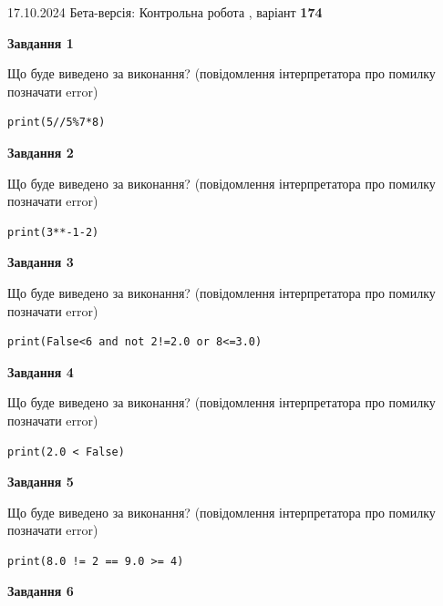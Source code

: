 \documentclass[12pt, ukrainian]{article}
\begin{document}
{\Large{17.10.2024 Бета-версія: Контрольна робота , варіант  \No \textbf { 174 }\par}}
{
\begin {large}
{\begin {center}\textbf{Завдання 1}\end {center}}

Що буде виведено за виконання? (повідомлення інтерпретатора про помилку позначати error)\par
\begin{verbatim}
print(5//5%7*8)
\end{verbatim}

{\begin {center}\textbf{Завдання 2}\end {center}}

Що буде виведено за виконання? (повідомлення інтерпретатора про помилку позначати error)\par
\begin{verbatim}
print(3**-1-2)
\end{verbatim}

{\begin {center}\textbf{Завдання 3}\end {center}}

Що буде виведено за виконання? (повідомлення інтерпретатора про помилку позначати error)\par
\begin{verbatim}
print(False<6 and not 2!=2.0 or 8<=3.0)
\end{verbatim}

{\begin {center}\textbf{Завдання 4}\end {center}}

Що буде виведено за виконання? (повідомлення інтерпретатора про помилку позначати error)\par
\begin{verbatim}
print(2.0 < False)
\end{verbatim}

{\begin {center}\textbf{Завдання 5}\end {center}}

Що буде виведено за виконання? (повідомлення інтерпретатора про помилку позначати error)\par
\begin{verbatim}
print(8.0 != 2 == 9.0 >= 4)
\end{verbatim}

{\begin {center}\textbf{Завдання 6}\end {center}}


\end{large}}
\end{document}
